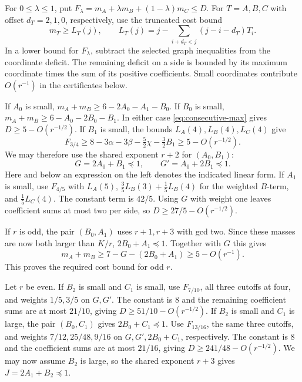 \documentclass[11pt,reqno]{amsart}
\begin{document}
For \(0\le\lambda\le1\), put
\(F_\lambda=m_A+\lambda m_B+(1-\lambda)m_C\le D\).
For \(T=A,B,C\) with offset \(d_T=2,1,0\), respectively, use the
truncated cost bound
\[
  m_T\ge L_T(j), \qquad
  L_T(j)=j-\sum_{i+d_T<j}(j-i-d_T)T_i.
\]
In a lower bound for \(F_\lambda\), subtract the selected graph
inequalities from the coordinate deficit. The remaining deficit
on a side is bounded by its maximum coordinate times the sum
of its positive coefficients. Small coordinates contribute
\(O(r^{-1})\) in the certificates below.

If \(A_0\) is small, \(m_A+m_B\ge6-2A_0-A_1-B_0\).
If \(B_0\) is small, \(m_A+m_B\ge6-A_0-2B_0-B_1\).
In either case \eqref{eq:consecutive-max} gives \(D\ge5-O(r^{-1/2})\).
If \(B_1\) is small, the bounds \(L_A(4),L_B(4),L_C(4)\) give
\[
 F_{3/4}\ge8-3\alpha-3\beta-\tfrac52\chi-\tfrac32B_1
            \ge5-O(r^{-1/2}).
\]
We may therefore use the shared exponent \(r+2\) for \((A_0,B_1)\):
\[
              G=2A_0+B_1\preceq 1,\qquad
              G'=A_0+2B_1\preceq 1 .
\]
Here and below an expression on the left denotes the indicated
linear form. If \(A_1\) is small, use \(F_{4/5}\) with \(L_A(5)\),
\(\frac35 L_B(3)+\frac15 L_B(4)\) for the weighted \(B\)-term,
and \(\frac15 L_C(4)\). The constant term is \(42/5\).
Using \(G\) with weight one leaves coefficient sums at most two
per side, so \(D\ge27/5-O(r^{-1/2})\).

If \(r\) is odd, the pair \((B_0,A_1)\) uses \(r+1,r+3\) with gcd
two. Since these masses are now both larger than \(K/r\),
\(2B_0+A_1\preceq 1\). Together with \(G\) this gives
\[
               m_A+m_B\ge7-G-(2B_0+A_1)\ge5-O(r^{-1}).
\]
This proves the required cost bound for odd \(r\).

Let \(r\) be even. If \(B_2\) is small and \(C_1\) is small, use
\(F_{7/10}\), all three cutoffs at four, and weights \(1/5,3/5\)
on \(G,G'\). The constant is \(8\) and the remaining coefficient
sums are at most \(21/10\), giving \(D\ge51/10-O(r^{-1/2})\).
If \(B_2\) is small and \(C_1\) is large, the pair \((B_0,C_1)\)
gives \(2B_0+C_1\preceq 1\). Use \(F_{13/16}\), the same
three cutoffs, and weights \(7/12,25/48,9/16\) on
\(G,G',2B_0+C_1\), respectively. The constant is \(8\) and the
coefficient sums are at most \(21/16\), giving
\(D\ge241/48-O(r^{-1/2})\). We may now assume \(B_2\) is large,
so the shared exponent \(r+3\) gives \(J=2A_1+B_2\preceq 1\).
\end{document}
